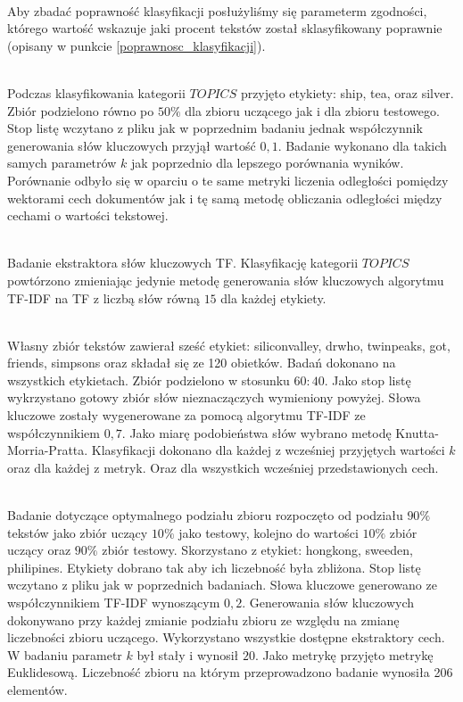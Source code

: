 \documentclass{classrep}
\begin{document}
\\ Aby zbadać poprawność klasyfikacji posłużyliśmy się parameterm zgodności, którego wartość wskazuje
jaki procent tekstów został sklasyfikowany poprawnie (opisany w punkcie \ref{poprawnosc_klasyfikacji}).

\\Podczas klasyfikowania kategorii $TOPICS$ przyjęto etykiety: ship, tea, oraz silver.
Zbiór podzielono równo po $50\%$ dla zbioru uczącego jak i dla zbioru testowego. Stop listę wczytano z pliku
jak w poprzednim badaniu jednak współczynnik generowania słów kluczowych przyjął wartość $0,1$. Badanie
wykonano dla takich samych parametrów $k$ jak poprzednio dla lepszego porównania wyników. Porównanie odbyło
się w oparciu o te same metryki liczenia odległości pomiędzy wektorami cech dokumentów jak i tę samą metodę
obliczania odległości między cechami o wartości tekstowej.

\\Badanie ekstraktora słów kluczowych TF. Klasyfikację kategorii $TOPICS$ powtórzono zmieniając jedynie
metodę generowania słów kluczowych algorytmu TF-IDF na TF z liczbą słów równą $15$ dla każdej etykiety.

\\Własny zbiór tekstów zawierał sześć etykiet: siliconvalley, drwho, twinpeaks, got, friends, simpsons
oraz składał się ze 120 obietków. Badań dokonano na wszystkich etykietach. Zbiór podzielono
w stosunku $60:40$. Jako stop listę wykrzystano
gotowy zbiór słów nieznaczączych wymieniony powyżej. Słowa kluczowe zostały wygenerowane za pomocą
algorytmu TF-IDF ze współczynnikiem $0,7$. Jako miarę podobieństwa słów wybrano metodę Knutta-Morria-Pratta.
Klasyfikacji dokonano dla każdej z wcześniej przyjętych wartości $k$ oraz dla każdej z metryk. Oraz dla
wszystkich wcześniej przedstawionych cech.

\\Badanie dotyczące optymalnego podziału zbioru rozpoczęto od podziału $90\%$ tekstów jako zbiór uczący
$10\%$ jako testowy, kolejno do wartości $10\%$ zbiór uczący oraz $90\%$ zbiór testowy. Skorzystano z
etykiet: hongkong, sweeden, philipines. Etykiety dobrano tak aby ich liczebność była zbliżona.
Stop listę wczytano z pliku jak w poprzednich badaniach. Słowa kluczowe generowano ze współczynnikiem
TF-IDF wynoszącym $0,2$. Generowania słów kluczowych dokonywano przy każdej zmianie podziału zbioru
ze względu na zmianę liczebności zbioru uczącego. Wykorzystano wszystkie dostępne ekstraktory cech.
W badaniu parametr $k$ był
stały i wynosił $20$. Jako metrykę przyjęto metrykę Euklidesową. Liczebność zbioru na którym
przeprowadzono badanie wynosiła 206 elementów.
\end{document}
